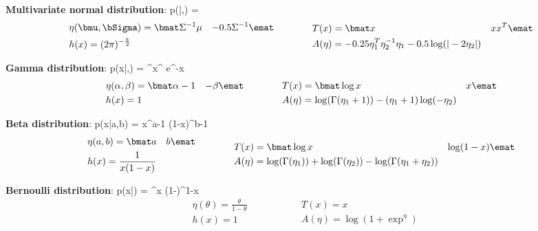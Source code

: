 \textbf{Multivariate normal distribution}:
\beq
	p(\bfx|\bmu,\bSigma) =    \\
\eeq
\begin{equation}
\begin{split}
	& \eta(\bmu,\bSigma)  = \bmat \Sigma^{-1} \mu & -0.5\Sigma^{-1} \emat \\
	& h(x) = (2\pi)^{-\frac{k}{2}}
\end{split}
\qquad \qquad
\begin{split}
	& T(x) = \bmat x & xx^T \emat \\
	& A(\eta) = -0.25\eta_1^T \eta_2^{-1} \eta_1 - 0.5\log(|-2\eta_2|)
\end{split}
\end{equation}

\textbf{Gamma distribution}:
\beq
p(x|\alpha,\beta) =  \beta^\alpha x^{} e^{-\beta x}
\eeq
\begin{equation}
\begin{split}
	& \eta(\alpha,\beta) = \bmat \alpha - 1 & -\beta \emat \\
	& h(x) = 1
\end{split}
\qquad \qquad
\begin{split}
	& T(x) = \bmat \log x & x \emat \\
	& A(\eta) = \log(\Gamma(\eta_1 + 1)) - (\eta_1 + 1) \log(-\eta_2)
\end{split}
\end{equation}

\textbf{Beta distribution}:
\beq
p(x|a,b) =  x^{a-1} (1-x)^{b-1} 
\eeq
\begin{equation}
\begin{split}
	& \eta(a,b) = \bmat a & b\emat \\
	& h(x) = \frac{1}{x(1-x)}
\end{split}
\qquad \qquad
\begin{split}
	& T(x) = \bmat \log x & \log (1-x) \emat \\
	& A(\eta) = \log(\Gamma(\eta_1)) +\log(\Gamma(\eta_2)) - \log(\Gamma(\eta_1+\eta_2))
\end{split}
\end{equation}

\textbf{Bernoulli distribution}:
\beq
	p(x|\theta) = \theta^x (1-\theta)^{1-x}
\eeq
\begin{equation}
\begin{split}
& \eta(\theta) = \frac{\theta}{1-\theta} \\
& h(x) = 1
\end{split}
\qquad \qquad
\begin{split}
& T(x) = x \\
& A(\eta) = \log(1+\exp^\eta)
\end{split}
\end{equation}


